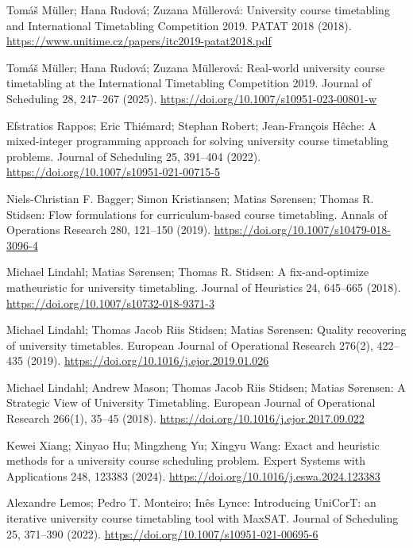  Tom{\'a}{\v s} M{\"u}ller; Hana Rudov{\'a}; Zuzana M{\"u}llerov{\'a}: University course timetabling and International Timetabling Competition 2019. PATAT 2018 (2018). \url{https://www.unitime.cz/papers/itc2019-patat2018.pdf}

 Tom{\'a}{\v s} M{\"u}ller; Hana Rudov{\'a}; Zuzana M{\"u}llerov{\'a}: Real-world university course timetabling at the International Timetabling Competition 2019. Journal of Scheduling 28, 247--267 (2025). \url{https://doi.org/10.1007/s10951-023-00801-w}

 Efstratios Rappos; Eric Thi{\'e}mard; Stephan Robert; Jean-Fran{\c c}ois H{\^e}che: A mixed-integer programming approach for solving university course timetabling problems. Journal of Scheduling 25, 391--404 (2022). \url{https://doi.org/10.1007/s10951-021-00715-5}

 Niels-Christian F. Bagger; Simon Kristiansen; Matias S{\o}rensen; Thomas R. Stidsen: Flow formulations for curriculum-based course timetabling. Annals of Operations Research 280, 121--150 (2019). \url{https://doi.org/10.1007/s10479-018-3096-4}

 Michael Lindahl; Matias S{\o}rensen; Thomas R. Stidsen: A fix-and-optimize matheuristic for university timetabling. Journal of Heuristics 24, 645--665 (2018). \url{https://doi.org/10.1007/s10732-018-9371-3}

 Michael Lindahl; Thomas Jacob Riis Stidsen; Matias S{\o}rensen: Quality recovering of university timetables. European Journal of Operational Research 276(2), 422--435 (2019). \url{https://doi.org/10.1016/j.ejor.2019.01.026}

 Michael Lindahl; Andrew Mason; Thomas Jacob Riis Stidsen; Matias S{\o}rensen: A Strategic View of University Timetabling. European Journal of Operational Research 266(1), 35--45 (2018). \url{https://doi.org/10.1016/j.ejor.2017.09.022}

 Kewei Xiang; Xinyao Hu; Mingzheng Yu; Xingyu Wang: Exact and heuristic methods for a university course scheduling problem. Expert Systems with Applications 248, 123383 (2024). \url{https://doi.org/10.1016/j.eswa.2024.123383}

 Alexandre Lemos; Pedro T. Monteiro; In{\^e}s Lynce: Introducing UniCorT: an iterative university course timetabling tool with MaxSAT. Journal of Scheduling 25, 371--390 (2022). \url{https://doi.org/10.1007/s10951-021-00695-6}

